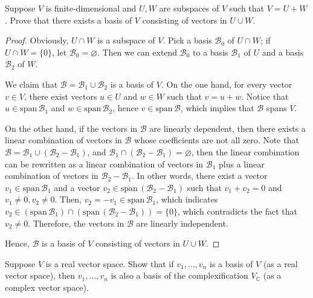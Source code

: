 \documentclass{article}
\newcommand{\sspan}{\text{span}\,}
\begin{document}
\begin{problem}[2B-5]
    Suppose \( V \) is finite-dimensional and \( U, W \) are subspaces of \( V \) such that \( V = U + W \). Prove that there exists a basis of \( V \) consisting of vectors in \( U \cup W \).
\end{problem}

\begin{proof}
    Obviously, $ U\cap W $ is a subspace of $ V $. Pick a basis $ \mathcal{B}_0 $ of $ U\cap W $; if $ U\cap W=\{0\} $, let $ \mathcal{B}_0=\varnothing $. Then we can extend $ \mathcal{B}_0 $ to a basis $ \mathcal{B}_1 $ of $ U $ and a basis $ \mathcal{B}_2 $ of $ W $. \par 
    We claim that $ \mathcal{B}=\mathcal{B}_1\cup\mathcal{B}_2 $ is a basis of $ V $. On the one hand, for every vector $ v\in V $, there exist vectors $ u\in U $ and $ w\in W $ such that $ v=u+w $. Notice that $ u\in\sspan\mathcal{B}_1 $ and $ w\in\sspan\mathcal{B}_2 $, hence $ v\in\sspan\mathcal{B} $, which implies that $\mathcal{B}$ spans $V$. \par 
    On the other hand, if the vectors in $ \mathcal{B} $ are linearly dependent, then there exists a linear combination of vectors in $ \mathcal{B} $ whose coefficients are not all zero. Note that $ \mathcal{B}=\mathcal{B}_1\cup(\mathcal{B}_2-\mathcal{B}_1) $, and $ \mathcal{B}_1\cap(\mathcal{B}_2-\mathcal{B}_1)=\varnothing $, then the linear combination can be rewritten as a linear combination of vectors in $ \mathcal{B}_1 $ plus a linear combination of vectors in $ \mathcal{B}_2-\mathcal{B}_1 $. In other words, there exist a vector $ v_1\in\sspan \mathcal{B}_1 $ and a vector $ v_2\in\sspan(\mathcal{B}_2-\mathcal{B}_1) $ such that $ v_1+v_2=0 $ and $ v_1\neq0, v_2\neq0 $. Then, $ v_2=-v_1\in\sspan \mathcal{B}_1 $, which indicates $ v_2\in(\sspan \mathcal{B}_1)\cap(\sspan (\mathcal{B}_2-\mathcal{B}_1))=\{0\} $, which contradicts the fact that $ v_2\neq0 $. Therefore, the vectors in $ \mathcal{B} $ are linearly independent. \par
    Hence, $ \mathcal{B} $ is a basis of $ V $ consisting of vectors in $ U\cup W $.
\end{proof}

\begin{problem}[2B-11]
    Suppose \( V \) is a real vector space. Show that if \( v_1, \ldots, v_n \) is a basis of \( V \) (as a real vector space), then \( v_1, \ldots, v_n \) is also a basis of the complexification \( V_{\mathbb{C}} \) (as a complex vector space).
\end{problem}
\end{document}
